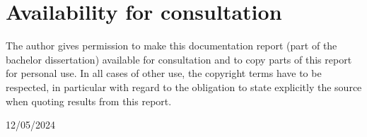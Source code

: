 \newpage
\thispagestyle{empty}

\section*{Availability for consultation}

The author gives permission to make this documentation report (part of the bachelor dissertation) available for consultation and to copy parts of this report for personal use. In all cases of other use, the copyright terms have to be respected, in particular with regard to the obligation to state explicitly the source when quoting results from this report.

\hfill 12/05/2024

